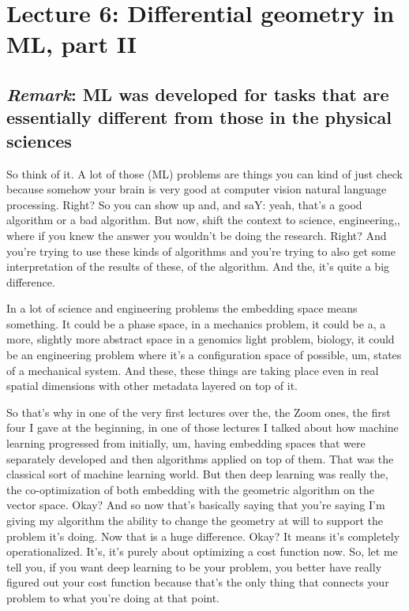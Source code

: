 \section{Lecture 6: Differential geometry in ML, part II}

\subsection{\textit{Remark}: ML was developed for tasks that are essentially different from those in the physical sciences}
So think of it. A lot of those (ML) problems are things you can kind of just check because somehow your brain is very good at computer vision natural language processing. Right? So you can show up and, and saY: yeah, that's a good algorithm or a bad algorithm. But now, shift the context to science, engineering,, where if you knew the answer you wouldn't be doing the research. Right? And you're trying to use these kinds of algorithms and you're trying to also get some interpretation of the results of these, of the algorithm. And the, it's quite a big difference.

In a lot of science and engineering problems the embedding space means something. It could be a phase space, in a mechanics problem, it could be a, a more, slightly more abstract space in a genomics light problem, biology, it could be an engineering problem where it's a configuration space of possible, um, states of a mechanical system. And these, these things are taking place even in real spatial dimensions with other metadata layered on top of it. 

So that's why in one of the very first lectures over the, the Zoom ones, the first four I gave at the beginning, in one of those lectures I talked about how machine learning progressed from initially, um, having embedding spaces that were separately developed and then algorithms applied on top of them. That was the classical sort of machine learning world. But then deep learning was really the, the co-optimization of both embedding with the geometric algorithm on the vector space. Okay? And so now that's basically saying that you're saying I'm giving my algorithm the ability to change the geometry at will to support the problem it's doing. Now that is a huge difference. Okay? It means it's completely operationalized. It's, it's purely about optimizing a cost function now. So, let me tell you, if you want deep learning to be your problem, you better have really figured out your cost function because that's the only thing that connects your problem to what you're doing at that point. 

